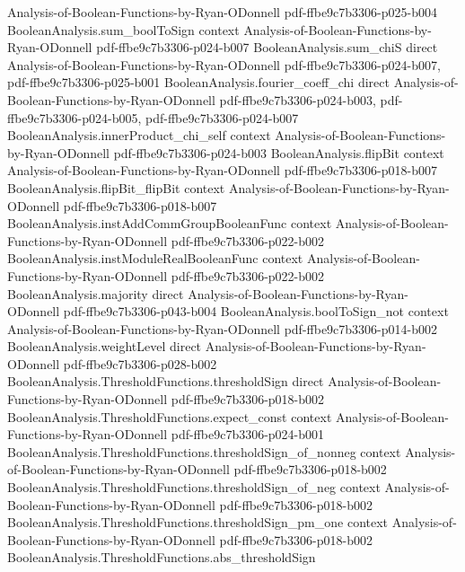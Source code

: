 \begin{theorem}
  {Analysis-of-Boolean-Functions-by-Ryan-ODonnell}
  {pdf-ffbe9c7b3306-p025-b004}
\proofstep
  {BooleanAnalysis.sum_boolToSign}
  {context}
  {Analysis-of-Boolean-Functions-by-Ryan-ODonnell}
  {pdf-ffbe9c7b3306-p024-b007}
\proofstep
  {BooleanAnalysis.sum_chiS}
  {direct}
  {Analysis-of-Boolean-Functions-by-Ryan-ODonnell}
  {pdf-ffbe9c7b3306-p024-b007,
    pdf-ffbe9c7b3306-p025-b001}
\proofstep
  {BooleanAnalysis.fourier_coeff_chi}
  {direct}
  {Analysis-of-Boolean-Functions-by-Ryan-ODonnell}
  {pdf-ffbe9c7b3306-p024-b003,
    pdf-ffbe9c7b3306-p024-b005,
    pdf-ffbe9c7b3306-p024-b007}
\proofstep
  {BooleanAnalysis.innerProduct_chi_self}
  {context}
  {Analysis-of-Boolean-Functions-by-Ryan-ODonnell}
  {pdf-ffbe9c7b3306-p024-b003}
\proofstep
  {BooleanAnalysis.flipBit}
  {context}
  {Analysis-of-Boolean-Functions-by-Ryan-ODonnell}
  {pdf-ffbe9c7b3306-p018-b007}
\proofstep
  {BooleanAnalysis.flipBit_flipBit}
  {context}
  {Analysis-of-Boolean-Functions-by-Ryan-ODonnell}
  {pdf-ffbe9c7b3306-p018-b007}
\proofstep
  {BooleanAnalysis.instAddCommGroupBooleanFunc}
  {context}
  {Analysis-of-Boolean-Functions-by-Ryan-ODonnell}
  {pdf-ffbe9c7b3306-p022-b002}
\proofstep
  {BooleanAnalysis.instModuleRealBooleanFunc}
  {context}
  {Analysis-of-Boolean-Functions-by-Ryan-ODonnell}
  {pdf-ffbe9c7b3306-p022-b002}
\proofstep
  {BooleanAnalysis.majority}
  {direct}
  {Analysis-of-Boolean-Functions-by-Ryan-ODonnell}
  {pdf-ffbe9c7b3306-p043-b004}
\proofstep
  {BooleanAnalysis.boolToSign_not}
  {context}
  {Analysis-of-Boolean-Functions-by-Ryan-ODonnell}
  {pdf-ffbe9c7b3306-p014-b002}
\proofstep
  {BooleanAnalysis.weightLevel}
  {direct}
  {Analysis-of-Boolean-Functions-by-Ryan-ODonnell}
  {pdf-ffbe9c7b3306-p028-b002}
\proofstep
  {BooleanAnalysis.ThresholdFunctions.thresholdSign}
  {direct}
  {Analysis-of-Boolean-Functions-by-Ryan-ODonnell}
  {pdf-ffbe9c7b3306-p018-b002}
\proofstep
  {BooleanAnalysis.ThresholdFunctions.expect_const}
  {context}
  {Analysis-of-Boolean-Functions-by-Ryan-ODonnell}
  {pdf-ffbe9c7b3306-p024-b001}
\proofstep
  {BooleanAnalysis.ThresholdFunctions.thresholdSign_of_nonneg}
  {context}
  {Analysis-of-Boolean-Functions-by-Ryan-ODonnell}
  {pdf-ffbe9c7b3306-p018-b002}
\proofstep
  {BooleanAnalysis.ThresholdFunctions.thresholdSign_of_neg}
  {context}
  {Analysis-of-Boolean-Functions-by-Ryan-ODonnell}
  {pdf-ffbe9c7b3306-p018-b002}
\proofstep
  {BooleanAnalysis.ThresholdFunctions.thresholdSign_pm_one}
  {context}
  {Analysis-of-Boolean-Functions-by-Ryan-ODonnell}
  {pdf-ffbe9c7b3306-p018-b002}
\proofstep
  {BooleanAnalysis.ThresholdFunctions.abs_thresholdSign}

\end{theorem}
